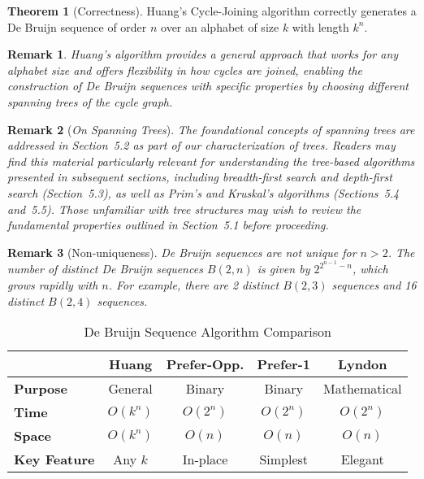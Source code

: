 \documentclass{article}
\newtheorem{remark}{Remark}
\theoremstyle{definition}
\newtheorem{theorem}{Theorem}
\begin{document}
\begin{theorem}[Correctness]
Huang's Cycle-Joining algorithm correctly generates a De Bruijn sequence of order $n$ over an alphabet of size $k$ with length $k^n$.
\end{theorem}

\begin{remark}
Huang's algorithm provides a general approach that works for any alphabet size and offers flexibility in how cycles are joined, enabling the construction of De Bruijn sequences with specific properties by choosing different spanning trees of the cycle graph.
\end{remark}

\begin{remark}[\textit{On Spanning Trees}]
The foundational concepts of spanning trees are addressed in Section~5.2 as part of our characterization of trees. Readers may find this material particularly relevant for understanding the tree-based algorithms presented in subsequent sections, including breadth-first search and depth-first search (Section~5.3), as well as Prim's and Kruskal's algorithms (Sections~5.4 and~5.5). Those unfamiliar with tree structures may wish to review the fundamental properties outlined in Section~5.1 before proceeding.
\end{remark}


\begin{remark}[Non-uniqueness]
De Bruijn sequences are not unique for $n > 2$. The number of distinct De Bruijn sequences $B(2,n)$ is given by $2^{2^{n-1}-n}$, which grows rapidly with $n$. For example, there are 2 distinct $B(2,3)$ sequences and 16 distinct $B(2,4)$ sequences.
\end{remark}

\begin{table}[htbp]
\centering
\caption{De Bruijn Sequence Algorithm Comparison}
\label{tab:debruijn_alg}
\small
\begin{tabular}{|l|c|c|c|c|}
\hline
 & \textbf{Huang} & \textbf{Prefer-Opp.} & \textbf{Prefer-1} & \textbf{Lyndon} \\
\hline
\textbf{Purpose} & General & Binary & Binary & Mathematical \\
\hline
\textbf{Time} & $O(k^n)$ & $O(2^n)$ & $O(2^n)$ & $O(2^n)$ \\
\hline
\textbf{Space} & $O(k^n)$ & $O(n)$ & $O(n)$ & $O(n)$ \\
\hline
\textbf{Key Feature} & Any $k$ & In-place & Simplest & Elegant \\
\hline
\end{tabular}
\end{table}
\end{document}
